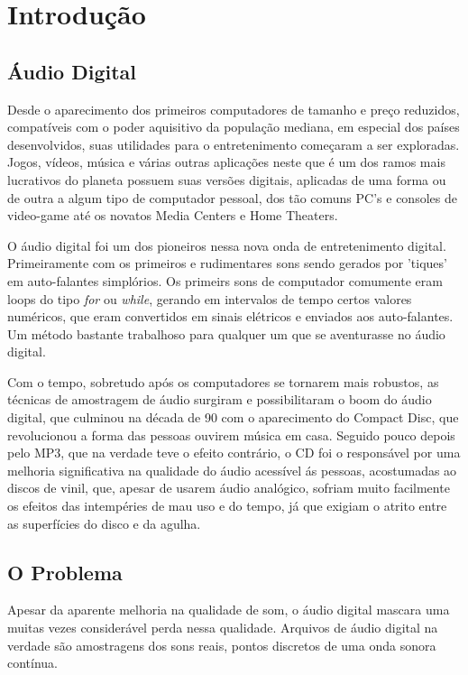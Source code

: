 \section{Introdução}
\subsection{Áudio Digital}
Desde o aparecimento dos primeiros computadores de tamanho e preço reduzidos, compatíveis com o 	poder aquisitivo da população mediana, em especial dos países desenvolvidos, suas utilidades para o entretenimento começaram a ser exploradas. Jogos, vídeos, música e várias outras aplicações neste que é um dos ramos mais lucrativos do planeta possuem suas versões digitais, aplicadas de uma forma ou de outra a algum tipo de computador pessoal, dos tão comuns PC's e consoles de video-game até os novatos Media Centers e Home Theaters.

O áudio digital foi um dos pioneiros nessa nova onda de entretenimento digital. Primeiramente com os primeiros e rudimentares sons sendo gerados por 'tiques' em auto-falantes simplórios. Os primeirs sons de computador comumente eram loops do tipo \textit{for} ou \textit{while}, gerando em intervalos de tempo certos valores numéricos, que eram convertidos em sinais elétricos e enviados aos auto-falantes. Um método bastante trabalhoso para qualquer um que se aventurasse no áudio digital.

Com o tempo, sobretudo após os computadores se tornarem mais robustos, as técnicas de amostragem de áudio surgiram e possibilitaram o boom do áudio digital, que culminou na década de 90 com o aparecimento do Compact Disc, que revolucionou a forma das pessoas ouvirem música em casa. Seguido pouco depois pelo MP3, que na verdade teve o efeito contrário, o CD foi o responsável por uma melhoria significativa na qualidade do áudio acessível ás pessoas, acostumadas ao discos de vinil, que, apesar de usarem áudio analógico, sofriam muito facilmente os efeitos das intempéries de mau uso e do tempo, já que exigiam o atrito entre as superfícies do disco e da agulha.

\subsection{O Problema}

Apesar da aparente melhoria na qualidade de som, o áudio digital mascara uma muitas vezes considerável perda nessa qualidade. Arquivos de áudio digital na verdade são amostragens dos sons reais, pontos discretos de uma onda sonora contínua.

